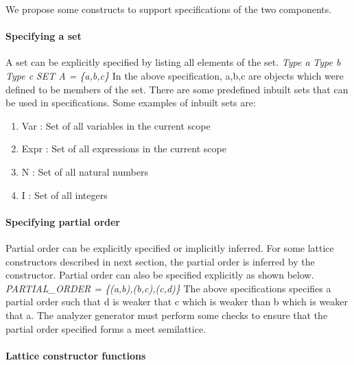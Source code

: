 \documentclass[12pt]{report}
\begin{document}
We propose some constructs to support specifications of the two components.

\paragraph{Specifying a set}

A set can be explicitly specified by listing all elements of the set.
\newline
\newline
\emph{Type a}
\newline
\emph{Type b}
\newline
\emph{Type c}
\newline
\emph{SET A = \{a,b,c\}}
\newline
\newline
In the above specification, a,b,c are objects which were defined to be members of the set. 
\newline
There are some predefined inbuilt sets that can be used in specifications. Some examples of inbuilt sets are:
\begin{enumerate}
\item Var : Set of all variables in the current scope
\item Expr : Set of all expressions in the current scope
\item N : Set of all natural numbers
\item I : Set of all integers
\end{enumerate}

\paragraph{Specifying partial order}

Partial order can be explicitly specified or implicitly inferred. For some lattice constructors described in next section, the partial order is inferred by the constructor. Partial order can also be specified explicitly as shown below.
\newline
\newline
\emph{PARTIAL\_ORDER = \{(a,b),(b,c),(c,d)\}}
\newline
\newline
The above specifications specifies a partial order such that d is weaker that c which is weaker than b which is weaker that a. The analyzer generator must perform some checks to ensure that the partial order specified forms a meet semilattice.


\paragraph{Lattice constructor functions}
\end{document}
